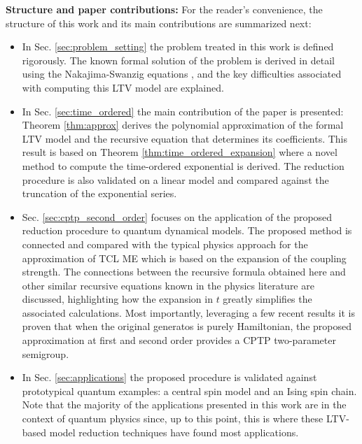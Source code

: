 \documentclass[twocolumn]{autart}    %
\begin{document}
\textbf{Structure and paper contributions:} For the reader's convenience, the structure of this work and its main contributions are summarized next:  
\begin{itemize}
    \item In Sec. \ref{sec:problem_setting} the problem treated in this work is defined rigorously. The known formal solution of the problem is derived in detail using the Nakajima-Swanzig equations \cite{nakajima,zwanzig},  and the key difficulties associated with computing this LTV model are explained.  
    \item In Sec. \ref{sec:time_ordered} the main contribution of the paper is presented: Theorem \ref{thm:approx} derives the polynomial approximation of the formal LTV model and the recursive equation that determines its coefficients. This result is based on Theorem \ref{thm:time_ordered_expansion} where a novel method to compute the time-ordered exponential is derived. The reduction procedure is also validated on a linear model and compared against the truncation of the exponential series. 
    \item Sec. \ref{sec:cptp_second_order} focuses on the application of the proposed reduction procedure to quantum dynamical models. The proposed method is connected and compared with the typical physics approach for the approximation of TCL ME which is based on the expansion of the coupling strength. The connections between the recursive formula obtained here and other similar recursive equations known in the physics literature \cite{nestmann2019time,cerrillo2014non,cygorek2025timenonlocalversustimelocallongtime,gasbarri2018recursive} are discussed, highlighting how the expansion in $t$ greatly simplifies the associated calculations. Most importantly, leveraging a few recent results \cite{grigoletto2024exact,grigoletto2025quantummodelreductioncontinuoustime} it is proven that when the original generatos is purely Hamiltonian, the proposed approximation at first and second order provides a CPTP two-parameter semigroup.
    \item In Sec. \ref{sec:applications} the proposed procedure is validated against prototypical quantum examples: a central spin model and an Ising spin chain. Note that the majority of the applications presented in this work are in the context of quantum physics since, up to this point, this is where these LTV-based model reduction techniques have found most applications.  
\end{itemize}
\end{document}
